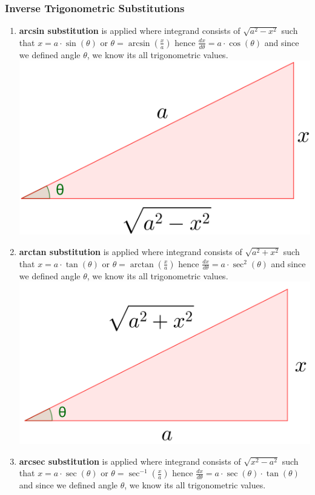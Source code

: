 \documentclass[12pt]{article}
\begin{document}
\subsubsection{Inverse Trigonometric Substitutions}
\begin{enumerate}
\item \textbf{arcsin substitution} is applied where integrand consists of $\sqrt{a^2-x^2}$ such that $x= a \cdot \sin (\theta)$ or $\theta = \arcsin (\frac{x}{a})$ hence $\frac{dx}{d\theta}=a\cdot \cos (\theta)$ and since we defined angle $\theta$, we know its all trigonometric values.\\
\includegraphics[scale=0.15]{asin_subs.png}
\item \textbf{arctan substitution} is applied where integrand consists of $\sqrt{a^2+x^2}$ such that $x= a \cdot \tan (\theta)$ or $\theta = \arctan (\frac{x}{a})$ hence $\frac{dx}{d\theta}=a\cdot \sec ^2(\theta)$ and since we defined angle $\theta$, we know its all trigonometric values.\\
\includegraphics[scale=0.15]{atan_subs.png}
\item \textbf{arcsec substitution} is applied where integrand consists of $\sqrt{x^2-a^2}$ such that $x= a \cdot \sec (\theta)$ or $\theta = \sec ^{-1} (\frac{x}{a})$ hence $\frac{dx}{d\theta}=a\cdot \sec (\theta)\cdot \tan (\theta)$ and since we defined angle $\theta$, we know its all trigonometric values.\\

\end{enumerate}
\end{document}
